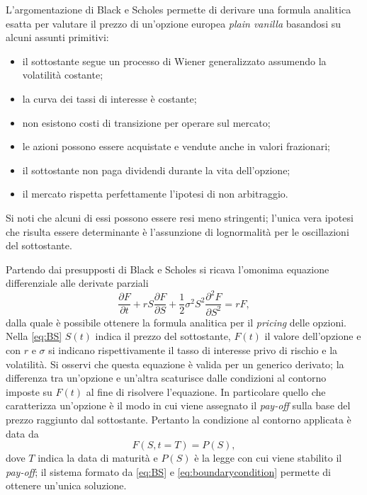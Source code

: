 L'argomentazione di Black e Scholes permette di derivare una formula analitica esatta per valutare il prezzo di un'opzione europea \textit{plain vanilla} basandosi su alcuni assunti primitivi:
\begin{itemize}
    \item il sottostante segue un processo di Wiener generalizzato assumendo la volatilità costante;
    \item la curva dei tassi di interesse è costante;
    \item non esistono costi di transizione per operare sul mercato;
    \item le azioni possono essere acquistate e vendute anche in valori frazionari;
    \item il sottostante non paga dividendi durante la vita dell'opzione;
    \item il mercato rispetta perfettamente l'ipotesi di non arbitraggio.
\end{itemize}
Si noti che alcuni di essi possono essere resi meno stringenti; l'unica vera ipotesi che risulta essere determinante è l'assunzione di lognormalità per le oscillazioni del sottostante.

Partendo dai presupposti di Black e Scholes si ricava l'omonima equazione differenziale alle derivate parziali
\begin{equation}
    \frac{\partial F}{\partial t} + rS \frac{\partial F}{\partial S} + \frac{1}{2} \sigma ^2 S ^2 \frac{\partial ^2 F}{\partial S^2} = r F
    \label{eq:BS},
\end{equation}
dalla quale è possibile ottenere la formula analitica per il \textit{pricing} delle opzioni. Nella \eqref{eq:BS} $S(t)$ indica il prezzo del sottostante, $F(t)$ il valore dell'opzione e con $r$ e $\sigma$ si indicano rispettivamente il tasso di interesse privo di rischio e la volatilità. Si osservi che questa equazione è valida per un generico derivato; la differenza tra un'opzione e un'altra scaturisce dalle condizioni al contorno imposte su $F(t)$ al fine di risolvere l'equazione. In particolare quello che caratterizza un'opzione è il modo in cui viene assegnato il \textit{pay-off} sulla base del prezzo raggiunto dal sottostante. Pertanto la condizione al contorno applicata è data da
\begin{equation}
    F(S,t=T) = P(S),
    \label{eq:boundarycondition}
\end{equation}
dove $T$ indica la data di maturità e $P(S)$ è la legge con cui viene stabilito il \textit{pay-off}; il sistema formato da \eqref{eq:BS} e \eqref{eq:boundarycondition} permette di ottenere un'unica soluzione.

